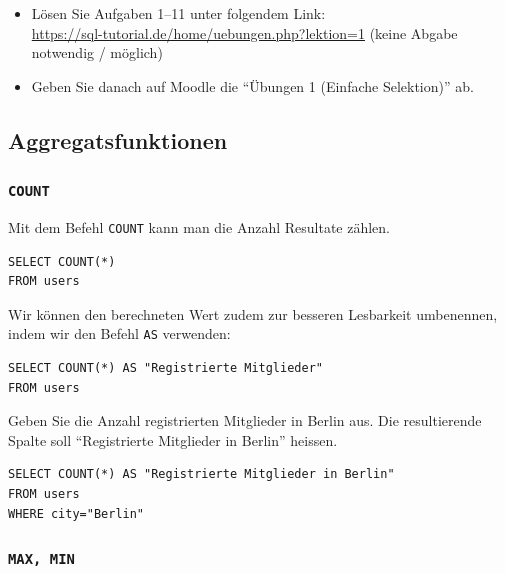 \begin{myexercise}
  \begin{itemize}
    \item Lösen Sie Aufgaben 1--11 unter folgendem Link:\\
\url{https://sql-tutorial.de/home/uebungen.php?lektion=1} (keine Abgabe notwendig / möglich)
    \item Geben Sie danach auf Moodle die \enquote{Übungen 1 (Einfache Selektion)} ab.
  \end{itemize}
\end{myexercise}

\subsection{Aggregatsfunktionen}

\subsubsection{\texorpdfstring{\lstinline|COUNT|}{COUNT}}

Mit dem Befehl \lstinline|COUNT| kann man die Anzahl Resultate zählen.

\begin{lstlisting}
SELECT COUNT(*)
FROM users
\end{lstlisting}

Wir können den berechneten Wert zudem zur besseren Lesbarkeit umbenennen, indem wir den Befehl \lstinline|AS| verwenden:

\begin{lstlisting}
SELECT COUNT(*) AS "Registrierte Mitglieder" 
FROM users
\end{lstlisting}

\begin{myexercise}
  Geben Sie die Anzahl registrierten Mitglieder in Berlin aus. Die resultierende Spalte soll \enquote{Registrierte Mitglieder in Berlin} heissen.
  \begin{myanswer}
    \begin{lstlisting}
SELECT COUNT(*) AS "Registrierte Mitglieder in Berlin" 
FROM users
WHERE city="Berlin"
\end{lstlisting}
  \end{myanswer}
\end{myexercise}

\subsubsection{\texorpdfstring{\lstinline|MAX, MIN|}{MAX, MIN}}


